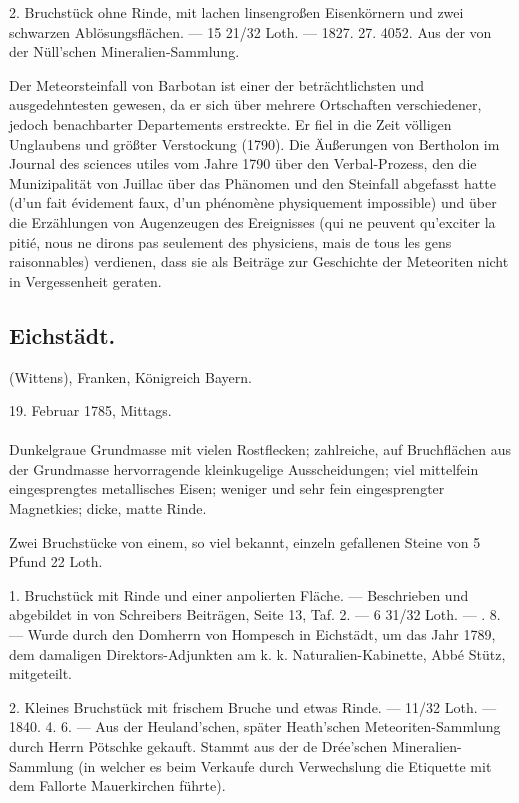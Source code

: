 \documentclass[a4paper, 11pt, oneside, polutonikogreek, german]{article}
\begin{document}
2. Bruchstück ohne Rinde, mit lachen linsengroßen Eisenkörnern und zwei schwarzen Ablösungsflächen. — 15 21/32 Loth. — 1827. 27. 4052. Aus der von der Nüll'schen Mineralien-Sammlung.

Der Meteorsteinfall von Barbotan ist einer der beträchtlichsten und ausgedehntesten gewesen, da er sich über mehrere Ortschaften verschiedener, jedoch benachbarter Departements erstreckte. Er fiel in die Zeit völligen Unglaubens und größter Verstockung (1790). Die Äußerungen von Bertholon im Journal des sciences utiles vom Jahre 1790 über den Verbal-Prozess, den die Munizipalität von Juillac über das Phänomen und den Steinfall abgefasst hatte (d'un fait évidement faux, d'un phénomène physiquement impossible) und über die Erzählungen von Augenzeugen des Ereignisses (qui ne peuvent qu'exciter la pitié, nous ne dirons pas seulement des physiciens, mais de tous les gens raisonnables) verdienen, dass sie als Beiträge zur Geschichte der Meteoriten nicht in Vergessenheit geraten.
\subsection{Eichstädt.}
\begin{center}
\small
(Wittens), Franken, Königreich Bayern.

19. Februar 1785, Mittags.
\end{center}
\paragraph{}
Dunkelgraue Grundmasse mit vielen Rostflecken; zahlreiche, auf Bruchflächen aus der Grundmasse hervorragende kleinkugelige Ausscheidungen; viel mittelfein eingesprengtes metallisches Eisen; weniger und sehr fein eingesprengter Magnetkies; dicke, matte Rinde.

Zwei Bruchstücke von einem, so viel bekannt, einzeln gefallenen Steine von 5 Pfund 22 Loth.

1. Bruchstück mit Rinde und einer anpolierten Fläche. — Beschrieben und abgebildet in von Schreibers Beiträgen, Seite 13, Taf. 2. — 6 31/32 Loth. — . 8. — Wurde durch den Domherrn von Hompesch in Eichstädt, um das Jahr 1789, dem damaligen Direktors-Adjunkten am k. k. Naturalien-Kabinette, Abbé Stütz, mitgeteilt.

2. Kleines Bruchstück mit frischem Bruche und etwas Rinde. — 11/32 Loth. — 1840. 4. 6. — Aus der Heuland'schen, später Heath'schen Meteoriten-Sammlung durch Herrn Pötschke gekauft. Stammt aus der de Drée'schen Mineralien-Sammlung (in welcher es beim Verkaufe durch Verwechslung die Etiquette mit dem Fallorte Mauerkirchen führte).
\end{document}
